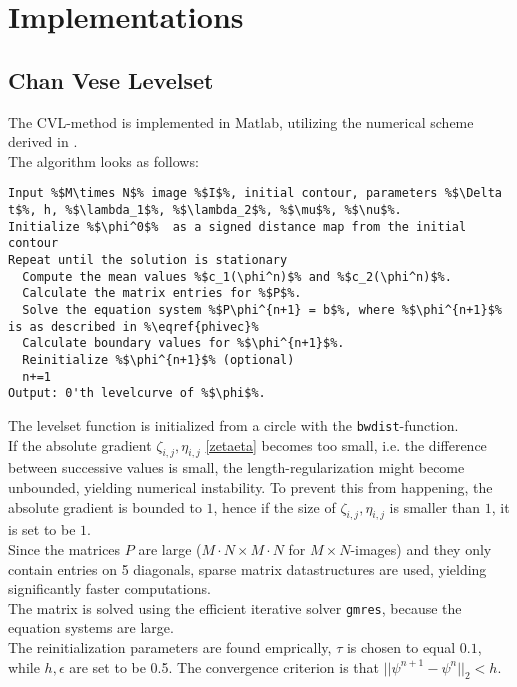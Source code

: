 \chapter{Implementations}\label{AppendixB} %

\section{Chan Vese Levelset}
The CVL-method is implemented in Matlab, utilizing the numerical scheme derived in .\\
The algorithm looks as follows:\\

\begin{lstlisting}
Input %$M\times N$% image %$I$%, initial contour, parameters %$\Delta t$%, h, %$\lambda_1$%, %$\lambda_2$%, %$\mu$%, %$\nu$%.
Initialize %$\phi^0$%  as a signed distance map from the initial contour
Repeat until the solution is stationary
  Compute the mean values %$c_1(\phi^n)$% and %$c_2(\phi^n)$%.
  Calculate the matrix entries for %$P$%.
  Solve the equation system %$P\phi^{n+1} = b$%, where %$\phi^{n+1}$% is as described in %\eqref{phivec}%
  Calculate boundary values for %$\phi^{n+1}$%.
  Reinitialize %$\phi^{n+1}$% (optional)
  n+=1
Output: 0'th levelcurve of %$\phi$%.
\end{lstlisting}

The levelset function is initialized from a circle with the \texttt{bwdist}-function.\\
If the absolute gradient $\zeta_{i,j}, \eta_{i,j}$ \eqref{zetaeta} becomes too small, i.e. the difference between successive values is small, the length-regularization might become unbounded, yielding numerical instability. To prevent this from happening, the absolute gradient is bounded to $1$, hence if the size of $\zeta_{i,j}, \eta_{i,j}$ is smaller than $1$, it is set to be $1$.\\
Since the matrices $P$ are large ($M\cdot N\times M\cdot N$ for $M\times N$-images) and they only contain entries on 5 diagonals, sparse matrix datastructures are used, yielding significantly faster computations.\\
The matrix is solved using the efficient iterative solver \texttt{gmres}, because the equation systems are large.\\
The reinitialization parameters are found emprically, $\tau$ is chosen to equal $0.1$, while $h,\epsilon$ are set to be 0.5. The convergence criterion is that $||\psi^{n+1}-\psi^n||_2 < h$. 


